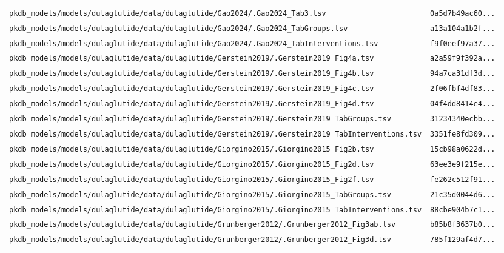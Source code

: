\documentclass{article}
\begin{document}
\begin{longtable}{ll}
\texttt{pkdb\_models/models/dulaglutide/data/dulaglutide/Gao2024/.Gao2024\_Tab3.tsv} & \texttt{0a5d7b49ac60...} \\
\texttt{pkdb\_models/models/dulaglutide/data/dulaglutide/Gao2024/.Gao2024\_TabGroups.tsv} & \texttt{a13a104a1b2f...} \\
\texttt{pkdb\_models/models/dulaglutide/data/dulaglutide/Gao2024/.Gao2024\_TabInterventions.tsv} & \texttt{f9f0eef97a37...} \\
\texttt{pkdb\_models/models/dulaglutide/data/dulaglutide/Gerstein2019/.Gerstein2019\_Fig4a.tsv} & \texttt{a2a59f9f392a...} \\
\texttt{pkdb\_models/models/dulaglutide/data/dulaglutide/Gerstein2019/.Gerstein2019\_Fig4b.tsv} & \texttt{94a7ca31df3d...} \\
\texttt{pkdb\_models/models/dulaglutide/data/dulaglutide/Gerstein2019/.Gerstein2019\_Fig4c.tsv} & \texttt{2f06fbf4df83...} \\
\texttt{pkdb\_models/models/dulaglutide/data/dulaglutide/Gerstein2019/.Gerstein2019\_Fig4d.tsv} & \texttt{04f4dd8414e4...} \\
\texttt{pkdb\_models/models/dulaglutide/data/dulaglutide/Gerstein2019/.Gerstein2019\_TabGroups.tsv} & \texttt{31234340ecbb...} \\
\texttt{pkdb\_models/models/dulaglutide/data/dulaglutide/Gerstein2019/.Gerstein2019\_TabInterventions.tsv} & \texttt{3351fe8fd309...} \\
\texttt{pkdb\_models/models/dulaglutide/data/dulaglutide/Giorgino2015/.Giorgino2015\_Fig2b.tsv} & \texttt{15cb98a0622d...} \\
\texttt{pkdb\_models/models/dulaglutide/data/dulaglutide/Giorgino2015/.Giorgino2015\_Fig2d.tsv} & \texttt{63ee3e9f215e...} \\
\texttt{pkdb\_models/models/dulaglutide/data/dulaglutide/Giorgino2015/.Giorgino2015\_Fig2f.tsv} & \texttt{fe262c512f91...} \\
\texttt{pkdb\_models/models/dulaglutide/data/dulaglutide/Giorgino2015/.Giorgino2015\_TabGroups.tsv} & \texttt{21c35d0044d6...} \\
\texttt{pkdb\_models/models/dulaglutide/data/dulaglutide/Giorgino2015/.Giorgino2015\_TabInterventions.tsv} & \texttt{88cbe904b7c1...} \\
\texttt{pkdb\_models/models/dulaglutide/data/dulaglutide/Grunberger2012/.Grunberger2012\_Fig3ab.tsv} & \texttt{b85b8f3637b0...} \\
\texttt{pkdb\_models/models/dulaglutide/data/dulaglutide/Grunberger2012/.Grunberger2012\_Fig3d.tsv} & \texttt{785f129af4d7...} \\

\end{longtable}
\end{document}

